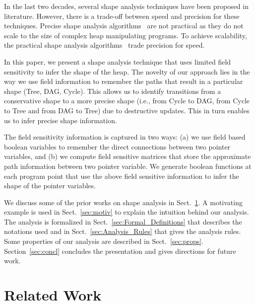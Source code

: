 \documentclass[letterpaper]{sig-alternate}
\begin{document}
In the last two decades, several shape analysis techniques have
been proposed in literature. However, there is a trade-off
between speed and precision for these techniques. Precise
shape analysis
algorithms~\cite{Sagiv96,shaham03heap,distefano06local,hackett05region} 
are not practical as they do not scale to the size of complex
heap manipulating programs. To achieve scalability,
the practical shape analysis
algorithms~\cite{Chase90,Ghiya96,marron06static} trade
precision for speed.

In this paper, we present a shape analysis technique that
uses limited field sensitivity to infer the shape of the
heap. The novelty of our approach lies in the way we use
field information to remember the paths that result in a
particular shape (Tree, DAG, Cycle). This allows us to
identify transitions from a conservative shape to a more precise
shape (i.e., from Cycle to DAG, from Cycle to Tree and from
DAG to Tree) due to destructive updates. This in turn enables
us to infer precise shape information.


The field sensitivity information is captured in two ways:
(a) we use field based boolean variables to remember the
direct connections between two pointer variables, and (b) we
compute field sensitive matrices that store the approximate
path information between two pointer variable. We generate
boolean functions at each program point that use the above
field sensitive information to infer the shape of the pointer
variables.

We discuss some of the prior works on shape analysis in
Sect.~\ref{sec:bgrel}. A motivating example is used in
Sect.~\ref{sec:motiv} to explain the intuition behind our
analysis. The analysis is formalized in
Sect.~\ref{sec:Formal_Definitions} that describes the
notations used and in Sect.~\ref{sec:Analysis_Rules} that
gives the analysis rules. Some properties of our analysis
are described in
Sect.~\ref{sec:props}. Section~\ref{sec:concl} concludes the
presentation and gives directions for future work.

\section{Related Work}\label{sec:bgrel}
\end{document}
